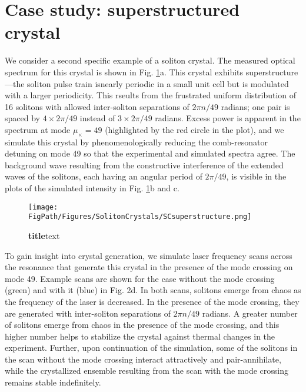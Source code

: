 \section{Case study: superstructured crystal}

We consider a second specific example of a soliton crystal. The measured optical spectrum for this crystal is shown in Fig. \ref{fig:SCsuperstructure}a. This crystal exhibits superstructure---the soliton pulse train isnearly periodic in a small unit cell but is modulated with a larger periodicity. This rseults from the frustrated uniform distribution of 16 solitons with allowed inter-soliton separations of $2\pi n/49$ radians; one pair is spaced by $4 \times 2\pi/49$ instead of $3 \times 2\pi/49$ radians.  Excess power is apparent in the spectrum at mode $\mu_\times=49$ (highlighted by the red circle in the plot), and we simulate this crystal by phenomenologically reducing the comb-resonator detuning on mode 49 so that the experimental and simulated spectra agree. The background wave resulting from the constructive interference of the extended waves of the solitons, each having an angular period of $2\pi/49$, is visible in the plots of the simulated intensity in Fig. \ref{fig:SCsuperstructure}b and c.

\begin{figure}[htpb]
	\begin{center}
		\texttt{[image: \\FigPath/Figures/SolitonCrystals/SCsuperstructure.png]}
	\end{center}
	\caption[Figure Title]{\textbf{title}text}
	\label{fig:SCsuperstructure}
\end{figure} 

To gain insight into crystal generation, we simulate laser frequency scans across the resonance that generate this crystal in the presence of the mode crossing on mode 49. Example scans are shown for the case without the mode crossing (green) and with it (blue) in Fig. 2d. In both scans, solitons emerge from chaos as the frequency of the laser is decreased. In the presence of the mode crossing, they are generated with inter-soliton separations of $2\pi n/49$ radians. A greater number of solitons emerge from chaos in the presence of the mode crossing, and this higher number helps to stabilize the crystal against thermal changes in the experiment. Further, upon continuation of the simulation, some of the solitons in the scan without the mode crossing interact attractively and pair-annihilate, while the crystallized ensemble resulting from the scan with the mode crossing remains stable indefinitely.

